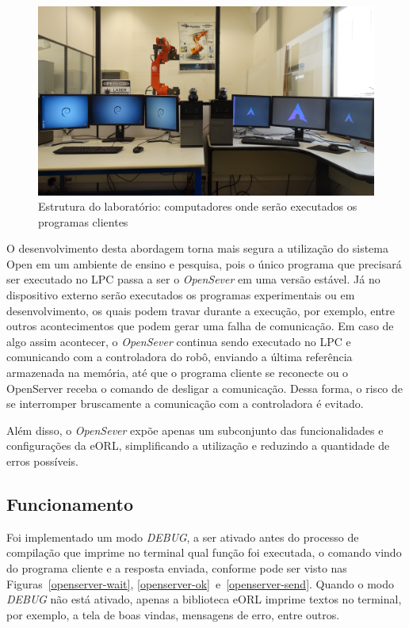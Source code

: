         \begin{figure}[ht]
            \centering
            \includegraphics[width=\columnwidth]{imagens/Fotos/estrutura-lab-2.JPG}
            \small 
            \centering 
            \caption{Estrutura do laboratório: computadores onde serão executados os programas clientes}
            \label{lab2}
        \end{figure}
        
        O desenvolvimento desta abordagem torna mais segura a utilização do sistema Open em um ambiente de ensino e pesquisa, pois o único programa que precisará ser executado no \ac{LPC} passa a ser o \textit{OpenSever} em uma versão estável. Já no dispositivo externo serão executados os programas experimentais ou em desenvolvimento, os quais podem travar durante a execução, por exemplo, entre outros acontecimentos que podem gerar uma falha de comunicação. Em caso de algo assim acontecer, o \textit{OpenSever} continua sendo executado no \ac{LPC} e comunicando com a controladora do robô, enviando a última referência armazenada na memória, até que o programa cliente se reconecte ou o OpenServer receba o comando de desligar a comunicação. Dessa forma, o risco de se interromper bruscamente a comunicação com a controladora é evitado.
        
        Além disso, o \textit{OpenSever} expõe apenas um subconjunto das funcionalidades e configurações da \ac{eORL}, simplificando a utilização e reduzindo a quantidade de erros possíveis.
    
        \subsection{Funcionamento}
        
            Foi implementado um modo \textit{DEBUG}, a ser ativado antes do processo de compilação que imprime no terminal qual função foi executada, o comando vindo do programa cliente e a resposta enviada, conforme pode ser visto nas Figuras~\ref{openserver-wait}, \ref{openserver-ok}~e~\ref{openserver-send}. Quando o modo \textit{DEBUG} não está ativado, apenas a biblioteca \ac{eORL} imprime textos no terminal, por exemplo, a tela de boas vindas, mensagens de erro, entre outros.
            
